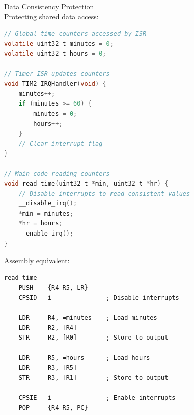 \begin{example2}{Data Consistency Protection}\\
Protecting shared data access:

\begin{lstlisting}[language=C, style=basesmol]
// Global time counters accessed by ISR
volatile uint32_t minutes = 0;
volatile uint32_t hours = 0;

// Timer ISR updates counters
void TIM2_IRQHandler(void) {
    minutes++;
    if (minutes >= 60) {
        minutes = 0;
        hours++;
    }
    // Clear interrupt flag
}

// Main code reading counters
void read_time(uint32_t *min, uint32_t *hr) {
    // Disable interrupts to read consistent values
    __disable_irq();
    *min = minutes;
    *hr = hours;
    __enable_irq();
}
\end{lstlisting}

Assembly equivalent:
\begin{lstlisting}[language=armasm, style=basesmol]
read_time
    PUSH    {R4-R5, LR}
    CPSID   i               ; Disable interrupts
    
    LDR     R4, =minutes    ; Load minutes
    LDR     R2, [R4]
    STR     R2, [R0]        ; Store to output
    
    LDR     R5, =hours      ; Load hours
    LDR     R3, [R5]
    STR     R3, [R1]        ; Store to output
    
    CPSIE   i               ; Enable interrupts
    POP     {R4-R5, PC}
\end{lstlisting}
\end{example2}

